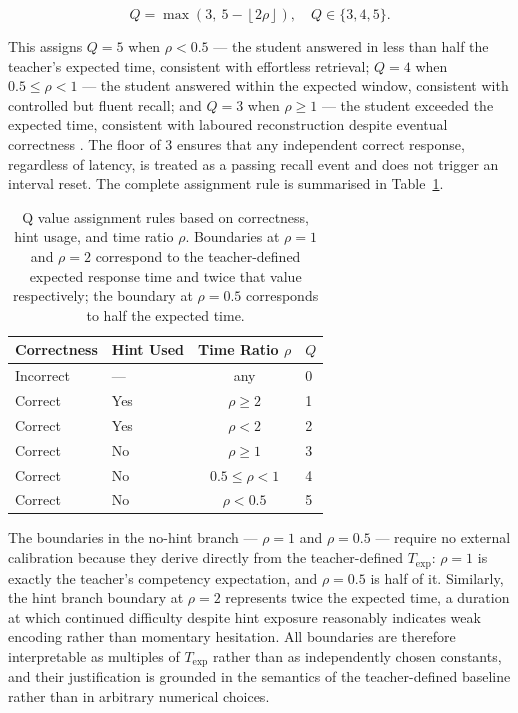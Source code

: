 \begin{equation}
Q = \max\!\left(3,\ 
    5 - \left\lfloor 2\rho \right\rfloor
\right), \quad Q \in \{3, 4, 5\}.
\end{equation}

This assigns $Q = 5$ when $\rho < 0.5$ — the student answered in less than half the teacher's expected time, consistent with effortless retrieval; $Q = 4$ when $0.5 \leq \rho < 1$ — the student answered within the expected window, consistent with controlled but fluent recall; and $Q = 3$ when $\rho \geq 1$ — the student exceeded the expected time, consistent with laboured reconstruction despite eventual correctness \cite{benjamin1996}. The floor of 3 ensures that any independent correct response, regardless of latency, is treated as a passing recall event and does not trigger an interval reset. The complete assignment rule is summarised in Table~\ref{tab:q_assignment}.

\begin{table}[H]
\centering
\small
\renewcommand{\arraystretch}{1.3}
\caption{Q value assignment rules based on correctness, hint usage, and time ratio $\rho$. Boundaries at $\rho = 1$ and $\rho = 2$ correspond to the teacher-defined expected response time and twice that value respectively; the boundary at $\rho = 0.5$ corresponds to half the expected time.}
\begin{tabular}{|l|l|c|l|}
\hline
\textbf{Correctness} & \textbf{Hint Used} & 
\textbf{Time Ratio $\rho$} & \textbf{$Q$} \\
\hline
Incorrect & — & any & 0 \\
\hline
Correct & Yes & $\rho \geq 2$ & 1 \\
Correct & Yes & $\rho < 2$    & 2 \\
\hline
Correct & No  & $\rho \geq 1$ & 3 \\
Correct & No  & $0.5 \leq \rho < 1$ & 4 \\
Correct & No  & $\rho < 0.5$  & 5 \\
\hline
\end{tabular}
\label{tab:q_assignment}
\end{table}

The boundaries in the no-hint branch — $\rho = 1$ and $\rho = 0.5$ — require no external calibration because they derive directly from the teacher-defined $T_{\text{exp}}$: $\rho = 1$ is exactly the teacher's competency expectation, and $\rho = 0.5$ is half of it. Similarly, the hint branch boundary at $\rho = 2$ represents twice the expected time, a duration at which continued difficulty despite hint exposure reasonably indicates weak encoding rather than momentary hesitation. All boundaries are therefore interpretable as multiples of $T_{\text{exp}}$ rather than as independently chosen constants, and their justification is grounded in the semantics of the teacher-defined baseline rather than in arbitrary numerical choices.

